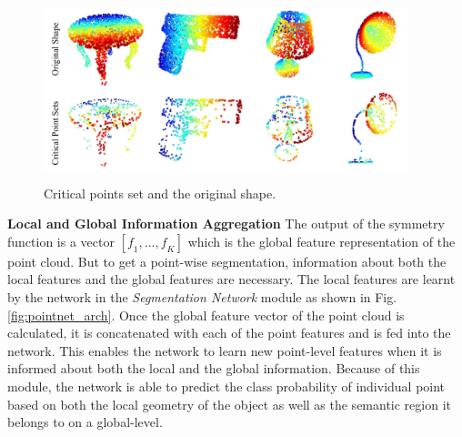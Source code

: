 \begin{figure}[t]
    \centering
    \includegraphics[width=300pt,height=150pt]{pictures/critical_points.jpg}
    \caption{Critical points set and the original shape.\cite{qi2017pointnet}}
    \label{fig:critical_points}
\end{figure}

\vspace{5mm}

\textbf{Local and Global Information Aggregation} The output of the symmetry function is a vector $[\mathit{f_1, ... , f_K}]$ which is the global feature representation of the point cloud. But to get a point-wise segmentation, information about both the local features and the global features are necessary. The local features are learnt by the network in the \textit{Segmentation Network} module as shown in Fig. \ref{fig:pointnet_arch}. Once the global feature vector of the point cloud is calculated, it is concatenated with each of the point features and is fed into the network. This enables the network to learn new point-level features when it is informed about both the local and the global information. Because of this module, the network is able to predict the class probability of individual point based on both the local geometry of the object as well as the semantic region it belongs to on a global-level.\cite{qi2017pointnet}

\vspace{5mm}


